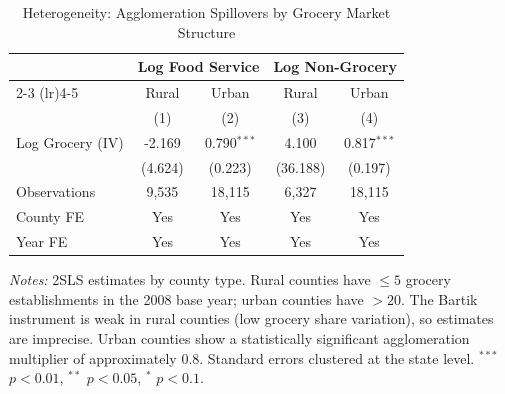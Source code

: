 \begin{table}[htbp]
\centering
\caption{Heterogeneity: Agglomeration Spillovers by Grocery Market Structure}
\label{tab:heterogeneity}
\small
\begin{tabular}{lcccc}
\hline\hline
 & \multicolumn{2}{c}{Log Food Service} & \multicolumn{2}{c}{Log Non-Grocery} \\
\cmidrule(lr){2-3} \cmidrule(lr){4-5}
 & Rural & Urban & Rural & Urban \\
 & (1) & (2) & (3) & (4) \\
\hline
Log Grocery (IV) & -2.169 & 0.790$^{***}$ & 4.100 & 0.817$^{***}$ \\
  & (4.624) & (0.223) & (36.188) & (0.197) \\
\hline
Observations & 9,535 & 18,115 & 6,327 & 18,115 \\
County FE & Yes & Yes & Yes & Yes \\
Year FE & Yes & Yes & Yes & Yes \\
\hline\hline
\end{tabular}
\begin{tablenotes}
\item \textit{Notes:} 2SLS estimates by county type. Rural counties have $\leq 5$ grocery establishments in the 2008 base year; urban counties have $> 20$. The Bartik instrument is weak in rural counties (low grocery share variation), so estimates are imprecise. Urban counties show a statistically significant agglomeration multiplier of approximately 0.8. Standard errors clustered at the state level. $^{***}$ $p<0.01$, $^{**}$ $p<0.05$, $^{*}$ $p<0.1$.
\end{tablenotes}
\end{table}
